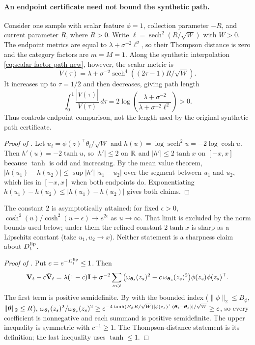 \paragraph{An endpoint certificate need not bound the synthetic path.}
Consider one sample with scalar feature $\phi=1$, collection parameter $-R$,
and current parameter $R$, where $R>0$.  Write
$\ell=\operatorname{sech}^2(R/\sqrt W)$ with $W>0$.  The endpoint metrics are
equal to $\lambda+\sigma^{-2}\ell^2$, so their Thompson distance is zero and
the category factors are $m=M=1$.  Along the synthetic interpolation
\eqref{eq:scalar-factor-path-new}, however, the scalar metric is
\[
 V(\tau)=\lambda+\sigma^{-2}
 \operatorname{sech}^4((2\tau-1)R/\sqrt W).
\]
It increases up to $\tau=1/2$ and then decreases, giving path length
\[
 \int_0^1\frac{|\dot V(\tau)|}{V(\tau)}\,d\tau
 =2\log\!\left(\frac{\lambda+\sigma^{-2}}
 {\lambda+\sigma^{-2}\ell^2}\right)>0.
\]
Thus  controls endpoint comparison, not the
length used by the original synthetic-path certificate.

\begin{proof}[Proof of ]
Let $u_i=\phi(z)^\top\theta_i/\sqrt W$ and
$h(u)=\log\operatorname{sech}^2u=-2\log\cosh u$. Then $h'(u)=-2\tanh u$, so
$|h'|\le2$ on $\mathbb{R}$ and $|h'|\le2\tanh x$ on $[-x,x]$ because $\tanh$ is odd and
increasing. By the mean value theorem,
$|h(u_1)-h(u_2)|\le\sup|h'|\,|u_1-u_2|$ over the segment between $u_1$ and
$u_2$, which lies in $[-x,x]$ when both endpoints do. Exponentiating
$h(u_1)-h(u_2)\le|h(u_1)-h(u_2)|$ gives both claims.
\end{proof}

The constant $2$ is asymptotically attained: for fixed $\epsilon>0$,
$\cosh^2(u)/\cosh^2(u-\epsilon)\to e^{2\epsilon}$ as $u\to\infty$. That limit
is excluded by the norm bounds used below; under them the refined constant
$2\tanh x$ is sharp as a Lipschitz constant (take $u_1,u_2\to x$). Neither
statement is a sharpness claim about $D_t^{\rm lip}$.

\begin{proof}[Proof of ]
Put $c=e^{-D_t^{\rm lip}}\le1$. Then
\[
 \mathbf{V}_t-c\bar{\mathbf{V}}_t=\lambda(1-c)\mathbf{I}+\sigma^{-2}\sum_{s<t}
 \big(\omega_{\boldsymbol{\theta}_t}(z_s)^2-c\,\omega_{\boldsymbol{\theta}_s}(z_s)^2\big)
 \phi(z_s)\phi(z_s)^\top.
\]
The first term is positive semidefinite. By 
with the bounded index ($\|\phi\|_2\le B_\phi$, $\|\boldsymbol{\theta}\|_2\le R$),
$\omega_{\boldsymbol{\theta}_t}(z_s)^2/\omega_{\boldsymbol{\theta}_s}(z_s)^2\ge
e^{-4\tanh(B_\phi R/\sqrt W)|\phi(z_s)^\top(\boldsymbol{\theta}_t-\boldsymbol{\theta}_s)|/\sqrt W}\ge c$,
so every coefficient is nonnegative and each summand is positive
semidefinite. The upper inequality is symmetric with $c^{-1}\ge1$. The
Thompson-distance statement is its definition; the last inequality uses
$\tanh\le1$.
\end{proof}

